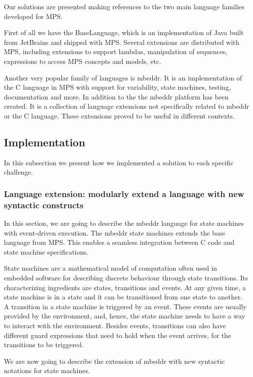 \documentclass[preprint,numbers,10pt]{sigplanconf}
\begin{document}
Our solutions are presented making references to the two main language families developed for MPS.

First of all we have the BaseLanguage, which is an implementation of Java built from JetBrains and shipped with MPS. Several extensions are distributed with MPS, including extensions to support lambdas, manipulation of sequences, expressions to access MPS concepts and models, etc.

Another very popular family of languages is mbeddr. It is an implementation of the C language in MPS with support for variability, state machines, testing, documentation and more. In addition to the the mbeddr platform has been created. It is a collection of language extensions not specifically related to mbeddr or the C language. These extensions proved to be useful in different contexts.

\subsection{Implementation}

In this subsection we present how we implemented a solution to each specific challenge.

\subsubsection{Language extension: modularly extend a language with new syntactic constructs}
\label{evr:langext}

In this section, we are going to describe the mbeddr language for state
machines with event-driven execution. The mbeddr state machines extends
the base language from MPS. This enables a seamless integration between
C code and state machine specifications.

State machines are a mathematical model of computation often used in embedded software
for describing discrete behaviour through state transitions. Its characterizing
ingredients are states, transitions and events. At any given time, a state
machine is in a state and it can be transitioned from one state to another.
A transition in a state machine is triggered by an event. These events
are usually provided by the environment, and, hence, the state machine
needs to have a way to interact with the environment. Besides events,
transitions can also have different guard expressions that need to hold when
the event arrives, for the transitions to be triggered.

We are now going to describe the extension of mbeddr with new syntactic notations for state machines.
\end{document}
